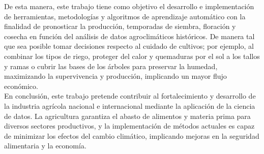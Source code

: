 De esta manera, este trabajo tiene como objetivo el desarrollo e implementación de herramientas, metodologías y algoritmos de aprendizaje automático con la finalidad de pronosticar la producción, temporadas de siembra, floración y cosecha en función del análisis de datos agroclimáticos históricos.  De manera tal que sea posible tomar decisiones respecto al cuidado de cultivos; por ejemplo, al combinar los tipos de riego, proteger del calor y quemaduras por el sol a los tallos y ramas  o cubrir las bases de los árboles para preservar la humedad, maximizando la supervivencia y producción, implicando un mayor flujo económico.\\

En conclusión, este trabajo pretende contribuir al fortalecimiento y desarrollo de la industria agrícola nacional e internacional mediante la aplicación de la ciencia de datos. La agricultura garantiza el abasto de alimentos y materia prima para diversos sectores productivos, y la implementación de métodos actuales es capaz de minimizar los efectos del cambio climático, implicando mejoras en la seguridad alimentaria y la economía.

